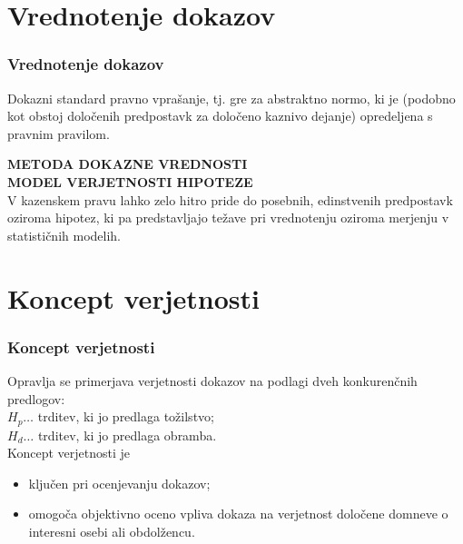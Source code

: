 \documentclass{beamer}
\begin{document}
\section{Vrednotenje dokazov}
\begin{frame}
    \frametitle{Vrednotenje dokazov}
    \begin{block}{Dokazni standard}
        pravno vprašanje, tj. gre za abstraktno normo, ki je (podobno kot obstoj določenih predpostavk za 
        določeno kaznivo dejanje) opredeljena s pravnim pravilom.
    \end{block}\vspace{3mm}
    \textbf{METODA DOKAZNE VREDNOSTI}\\
    \textbf{MODEL VERJETNOSTI HIPOTEZE}\\ \vspace{3mm}
    V kazenskem pravu lahko zelo hitro pride do posebnih, edinstvenih predpostavk oziroma hipotez, ki pa predstavljajo težave pri vrednotenju oziroma merjenju v statističnih modelih. 
\end{frame}


\section{Koncept verjetnosti}

\begin{frame}
    \frametitle{Koncept verjetnosti}
    Opravlja se primerjava verjetnosti dokazov na podlagi dveh konkurenčnih predlogov:\\
    $H_p \dots$ trditev, ki jo predlaga tožilstvo;\\
    $H_d \dots$ trditev, ki jo predlaga obramba.\\ \vspace{5mm}
    Koncept verjetnosti je
    \begin{itemize}
        \item ključen pri ocenjevanju dokazov;
        \item omogoča objektivno oceno vpliva dokaza na verjetnost določene domneve o interesni osebi ali obdolžencu.
    \end{itemize}
\end{frame}
\end{document}
